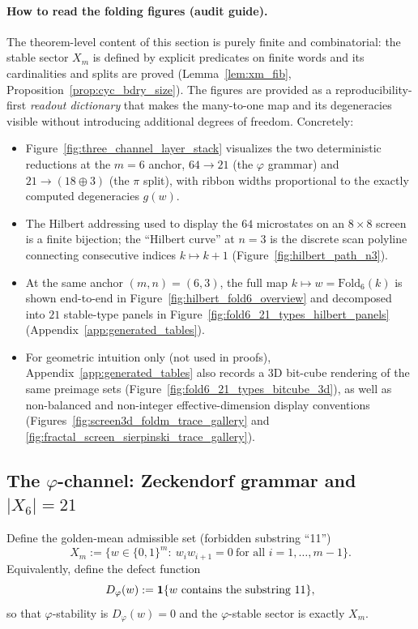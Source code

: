 \paragraph{How to read the folding figures (audit guide).}
The theorem-level content of this section is purely finite and combinatorial: the stable sector $X_m$ is defined by explicit predicates on finite words and its cardinalities and splits are proved (Lemma~\ref{lem:xm_fib}, Proposition~\ref{prop:cyc_bdry_size}).
The figures are provided as a reproducibility-first \emph{readout dictionary} that makes the many-to-one map and its degeneracies visible without introducing additional degrees of freedom.
Concretely:
\begin{itemize}
\item Figure~\ref{fig:three_channel_layer_stack} visualizes the two deterministic reductions at the $m=6$ anchor, $64\to 21$ (the $\varphi$ grammar) and $21\to (18\oplus 3)$ (the $\pi$ split), with ribbon widths proportional to the exactly computed degeneracies $g(w)$.
\item The Hilbert addressing used to display the $64$ microstates on an $8\times 8$ screen is a finite bijection; the ``Hilbert curve'' at $n=3$ is the discrete scan polyline connecting consecutive indices $k\mapsto k+1$ (Figure~\ref{fig:hilbert_path_n3}).
\item At the same anchor $(m,n)=(6,3)$, the full map $k\mapsto w=\mathrm{Fold}_6(k)$ is shown end-to-end in Figure~\ref{fig:hilbert_fold6_overview} and decomposed into $21$ stable-type panels in Figure~\ref{fig:fold6_21_types_hilbert_panels} (Appendix~\ref{app:generated_tables}).
\item For geometric intuition only (not used in proofs), Appendix~\ref{app:generated_tables} also records a 3D bit-cube rendering of the same preimage sets (Figure~\ref{fig:fold6_21_types_bitcube_3d}), as well as non-balanced and non-integer effective-dimension display conventions (Figures~\ref{fig:screen3d_foldm_trace_gallery} and \ref{fig:fractal_screen_sierpinski_trace_gallery}).
\end{itemize}

\subsection{The \texorpdfstring{$\varphi$}{phi}-channel: Zeckendorf grammar and \texorpdfstring{$|X_6|=21$}{|X6|=21}}
\label{subsec:phi_channel}

Define the golden-mean admissible set (forbidden substring ``11'')
\begin{equation}\label{eq:Xm_def}
X_m:=\{w\in\{0,1\}^m:\ w_i w_{i+1}=0\ \text{for all }i=1,\dots,m-1\}.
\end{equation}
Equivalently, define the defect function
\[
D_\varphi(w):=\mathbf{1}\{w\text{ contains the substring }11\},
\]
so that $\varphi$-stability is $D_\varphi(w)=0$ and the $\varphi$-stable sector is exactly $X_m$.

